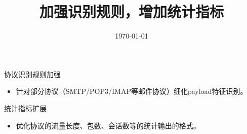 \documentclass{article}
\title{加强识别规则，增加统计指标}
\author{}
\date{\today}
\begin{document}
\maketitle
协议识别规则加强
\begin{itemize}
    \item 针对部分协议（SMTP/POP3/IMAP等邮件协议）细化payload特征识别。
\end{itemize}

统计指标扩展
\begin{itemize}
    \item 优化协议的流量长度、包数、会话数等的统计输出的格式。
\end{itemize}
\end{document}
